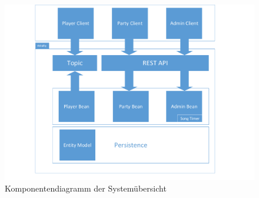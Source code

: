


\begin{figure}[H]
	\centering
	\includegraphics[width=1\linewidth]{Bilder/Komponentendiagramm}
	\caption{Komponentendiagramm der Systemübersicht }
	\label{fig:Komponentendiagramm}
\end{figure}

